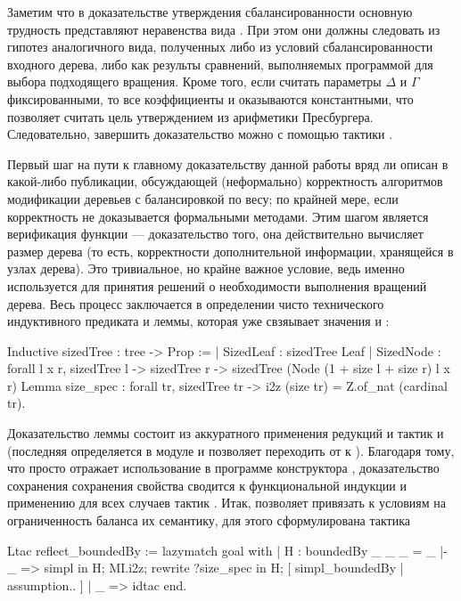 \documentclass[a4paper,14pt]{extarticle}
\begin{document}
Заметим что в доказательстве утверждения сбалансированности
основную трудность представляют неравенства вида
.
При этом они должны следовать из гипотез аналогичного вида, полученных
либо из условий сбалансированности входного дерева,
либо как результы сравнений, выполняемых программой
для выбора подходящего вращения.
Кроме того, если считать параметры
\( \Delta \) и \( \Gamma \)
фиксированными, то все коэффициенты  и 
оказываются константными,
что позволяет считать цель утверждением из арифметики Пресбургера.
Следовательно, завершить доказательство можно
с помощью тактики .

Первый шаг на пути к главному доказательству данной работы
вряд ли описан в какой-либо публикации,
обсуждающей (неформально) корректность алгоритмов модификации
деревьев с балансировкой по весу;
по крайней мере, если корректность не доказывается
формальными методами.
Этим шагом является верификация функции  ---
доказательство того, она действительно вычисляет размер дерева
(то есть, корректности дополнительной информации, хранящейся в узлах дерева).
Это тривиальное, но крайне важное условие,
ведь именно  используется для принятия
решений о необходимости выполнения вращений дерева.
Весь процесс заключается в определении
чисто технического индуктивного предиката
и леммы, которая уже свзяывает значения
 и :
\begin{coqcode}
Inductive sizedTree : tree -> Prop :=
  | SizedLeaf : sizedTree Leaf
  | SizedNode : forall l x r,
                sizedTree l ->
                sizedTree r ->
                sizedTree (Node
                  (1 + size l + size r)
                  l x r)
Lemma size_spec : forall tr, sizedTree tr ->
  i2z (size tr) = Z.of_nat (cardinal tr).
\end{coqcode}

Доказательство леммы состоит из
аккуратного применения редукций
и тактик 
и 
(последняя определяется в модуле
и позволяет переходить от  к ).
Благодаря тому, что  просто
отражает использование в программе конструктора ,
доказательство сохранения сохранения свойства
 сводится к функциональной индукции
и применению для всех случаев тактик .
Итак,  позволяет
привязать к условиям на ограниченность баланса
их семантику, для этого сформулирована тактика
\begin{coqcode}
Ltac reflect_boundedBy := lazymatch goal with
  | H : boundedBy _ _ _ = _ |- _ =>
    simpl in H;
    MI.i2z;
    rewrite ?size_spec in H;
    [ simpl_boundedBy | assumption.. ]
  | _ => idtac
end.
\end{coqcode}
\end{document}
